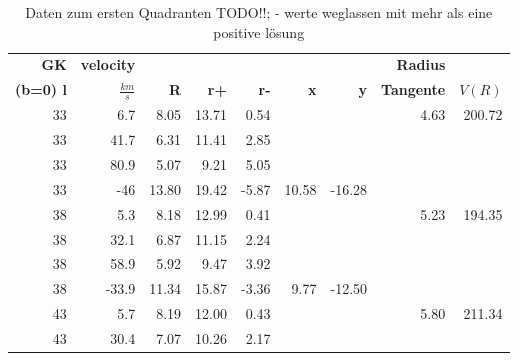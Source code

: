 

\listoffigures
\listoftables

\newpage
\begin{table}[H]
    \centering
    \caption{Daten zum ersten Quadranten TODO!!; - werte weglassen mit mehr als eine positive lösung}
\begin{tabular}{|r|r|r|r|r|r|r|r|r|}
\hline
    {\textbf{GK}} & {\textbf{velocity}} & {} &   {} &   {} &    {} &    {} & {\textbf{Radius}} & {} \\
    {\textbf{(b=0) l}} & {\textbf{$\si{}{\frac{km}{s}}$}}& {\textbf{R}} &   {\textbf{r+}} &   {\textbf{r-}} &    {\textbf{x} }&    {\textbf{y}} & {\textbf{Tangente}} & {\textbf{$V(R)$}} \\
    \hline
            33 &        6.7 &       8.05 &      13.71 &       0.54 &            &            &       4.63 &     200.72 \\
    
            33 &       41.7 &       6.31 &      11.41 &       2.85 &            &            &            &            \\
    
            33 &       80.9 &       5.07 &       9.21 &       5.05 &            &            &            &            \\
    
            33 &        -46 &      13.80 &      19.42 &      -5.87 &      10.58 &     -16.28 &            &            \\
    \hline
            38 &        5.3 &       8.18 &      12.99 &       0.41 &            &            &       5.23 &     194.35 \\
    
            38 &       32.1 &       6.87 &      11.15 &       2.24 &            &            &            &            \\
    
            38 &       58.9 &       5.92 &       9.47 &       3.92 &            &            &            &            \\
    
            38 &      -33.9 &      11.34 &      15.87 &      -3.36 &       9.77 &     -12.50 &            &            \\
    \hline
            43 &        5.7 &       8.19 &      12.00 &       0.43 &            &            &       5.80 &     211.34 \\
    
            43 &       30.4 &       7.07 &      10.26 &       2.17 &            &            &            &            \\
    

\end{tabular}
\end{table}
